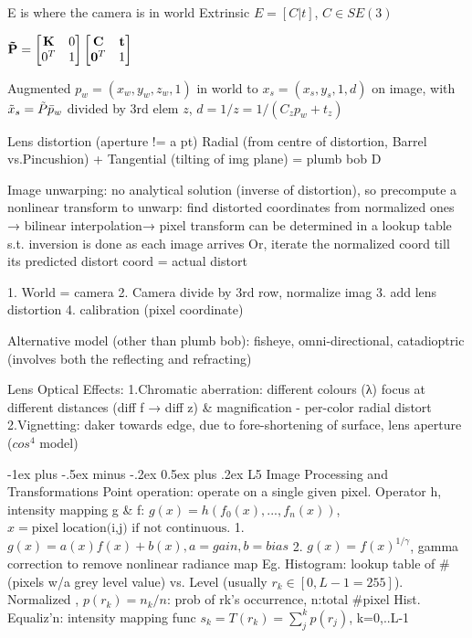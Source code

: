 \documentclass[10pt,landscape]{article}
\makeatletter
\renewcommand{\section}{\@startsection{section}{1}{0mm}%
                                {-1ex plus -.5ex minus -.2ex}%
                                {0.5ex plus .2ex}%
                                {\normalfont\large\bfseries}}
\makeatother
\begin{document}
\begin{multicols}{3}
E is where the camera is in world
Extrinsic $E=[C|t]$, $C\in SE(3)$

$\mathbf{\Tilde{P}} = \begin{bmatrix} \mathbf{K} & 0 \\ 0^T & 1\end{bmatrix}\begin{bmatrix} \mathbf{C} & \mathbf{t} \\ \mathbf{0}^T & 1\end{bmatrix}$

Augmented $p_w = (x_w, y_w, z_w, 1)$ in world to $x_s = (x_s, y_s, 1, d)$ on image, with $\Tilde{x}_s = \Tilde{P}\Bar{p}_w$ divided by 3rd elem $z$, $d=1/z=1/(C_zp_w+t_z)$

Lens distortion (aperture != a pt)
Radial (from centre of distortion, Barrel vs.Pincushion) + Tangential (tilting of img plane) = plumb bob D

Image unwarping: no analytical solution (inverse of distortion), so precompute a nonlinear transform to unwarp:  find distorted coordinates from normalized ones → bilinear interpolation→ pixel transform can be determined in a lookup table s.t. inversion is done as each image arrives
Or, iterate the normalized coord till its predicted distort coord = actual distort

1. World = camera
2. Camera divide by 3rd row, normalize imag
3. add lens distortion
4. calibration (pixel coordinate)

Alternative model (other than plumb bob): fisheye, omni-directional, catadioptric (involves both the reflecting and refracting)

Lens Optical Effects: 1.Chromatic aberration: different colours (λ) focus at different distances (diff f → diff z) & magnification - per-color radial distort 2.Vignetting: daker towards edge, due to fore-shortening of surface, lens aperture ($cos^4$ model)

\section{L5 Image Processing and Transformations}
Point operation: operate on a single given pixel. Operator h, intensity mapping g \& f: $g(x) = h(f_0(x), ..., f_n(x))$, $x = \text{pixel location(i,j) if not continuous}.$ 1. $g(x)=a(x)f(x)+b(x), a=gain, b=bias$
2. $g(x)=f(x)^{1/\gamma}$, gamma correction to remove nonlinear radiance map
Eg. Histogram: lookup table of #(pixels w/a grey level value)  vs. Level  (usually  $r_k \in [0, L-1=255]$). Normalized , $p(r_k) = n_k/n$: prob of rk’s occurrence, n:total #pixel
Hist. Equaliz’n: intensity mapping func $s_k = T(r_k) = \sum_j^kp(r_j)$, k=0,..L-1


\end{multicols}
\end{document}
